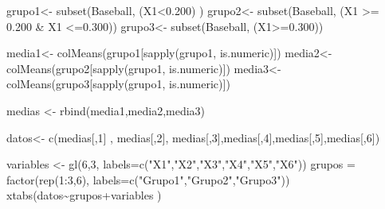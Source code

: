 \documentclass{staprojteamusb}
\newenvironment{Shaded}{\begin{snugshade}}{\end{snugshade}}
\newcommand{\AttributeTok}[1]{\textcolor[rgb]{0.77,0.63,0.00}{#1}}
\newcommand{\DecValTok}[1]{\textcolor[rgb]{0.00,0.00,0.81}{#1}}
\newcommand{\FloatTok}[1]{\textcolor[rgb]{0.00,0.00,0.81}{#1}}
\newcommand{\FunctionTok}[1]{\textcolor[rgb]{0.00,0.00,0.00}{#1}}
\newcommand{\NormalTok}[1]{#1}
\newcommand{\OtherTok}[1]{\textcolor[rgb]{0.56,0.35,0.01}{#1}}
\newcommand{\SpecialCharTok}[1]{\textcolor[rgb]{0.00,0.00,0.00}{#1}}
\newcommand{\StringTok}[1]{\textcolor[rgb]{0.31,0.60,0.02}{#1}}
\begin{document}
\begin{Shaded}
\begin{Highlighting}[]
\NormalTok{grupo1}\OtherTok{\textless{}{-}} \FunctionTok{subset}\NormalTok{(Baseball, (X1}\SpecialCharTok{\textless{}}\FloatTok{0.200}\NormalTok{) )}
\NormalTok{grupo2}\OtherTok{\textless{}{-}} \FunctionTok{subset}\NormalTok{(Baseball, (X1 }\SpecialCharTok{\textgreater{}=} \FloatTok{0.200} \SpecialCharTok{\&}\NormalTok{ X1 }\SpecialCharTok{\textless{}=}\FloatTok{0.300}\NormalTok{))}
\NormalTok{grupo3}\OtherTok{\textless{}{-}} \FunctionTok{subset}\NormalTok{(Baseball, (X1}\SpecialCharTok{\textgreater{}=}\FloatTok{0.300}\NormalTok{))}

\NormalTok{media1}\OtherTok{\textless{}{-}} \FunctionTok{colMeans}\NormalTok{(grupo1[}\FunctionTok{sapply}\NormalTok{(grupo1, is.numeric)]) }
\NormalTok{media2}\OtherTok{\textless{}{-}} \FunctionTok{colMeans}\NormalTok{(grupo2[}\FunctionTok{sapply}\NormalTok{(grupo1, is.numeric)])}
\NormalTok{media3}\OtherTok{\textless{}{-}} \FunctionTok{colMeans}\NormalTok{(grupo3[}\FunctionTok{sapply}\NormalTok{(grupo1, is.numeric)])}

\NormalTok{medias }\OtherTok{\textless{}{-}} \FunctionTok{rbind}\NormalTok{(media1,media2,media3)}

\NormalTok{datos}\OtherTok{\textless{}{-}} \FunctionTok{c}\NormalTok{(medias[,}\DecValTok{1}\NormalTok{] , medias[,}\DecValTok{2}\NormalTok{], medias[,}\DecValTok{3}\NormalTok{],medias[,}\DecValTok{4}\NormalTok{],medias[,}\DecValTok{5}\NormalTok{],medias[,}\DecValTok{6}\NormalTok{])}

\NormalTok{variables }\OtherTok{\textless{}{-}} \FunctionTok{gl}\NormalTok{(}\DecValTok{6}\NormalTok{,}\DecValTok{3}\NormalTok{, }\AttributeTok{labels=}\FunctionTok{c}\NormalTok{(}\StringTok{"X1"}\NormalTok{,}\StringTok{"X2"}\NormalTok{,}\StringTok{"X3"}\NormalTok{,}\StringTok{"X4"}\NormalTok{,}\StringTok{"X5"}\NormalTok{,}\StringTok{"X6"}\NormalTok{))}
\NormalTok{grupos }\OtherTok{=} \FunctionTok{factor}\NormalTok{(}\FunctionTok{rep}\NormalTok{(}\DecValTok{1}\SpecialCharTok{:}\DecValTok{3}\NormalTok{,}\DecValTok{6}\NormalTok{), }\AttributeTok{labels=}\FunctionTok{c}\NormalTok{(}\StringTok{"Grupo1"}\NormalTok{,}\StringTok{"Grupo2"}\NormalTok{,}\StringTok{"Grupo3"}\NormalTok{))}
\FunctionTok{xtabs}\NormalTok{(datos}\SpecialCharTok{\textasciitilde{}}\NormalTok{grupos}\SpecialCharTok{+}\NormalTok{variables )}
\end{Highlighting}
\end{Shaded}
\end{document}
